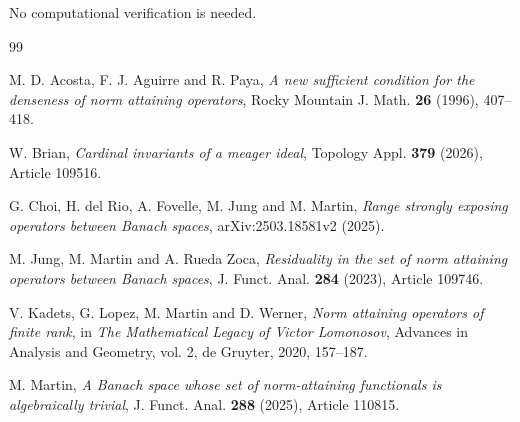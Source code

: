 \documentclass[11pt]{article}
\begin{document}
No computational verification is needed.

\begin{thebibliography}{99}

M. D. Acosta, F. J. Aguirre and R. Paya,
\emph{A new sufficient condition for the denseness of norm attaining operators},
Rocky Mountain J. Math. \textbf{26} (1996), 407--418.

W. Brian,
\emph{Cardinal invariants of a meager ideal},
Topology Appl. \textbf{379} (2026), Article 109516.

G. Choi, H. del Rio, A. Fovelle, M. Jung and M. Martin,
\emph{Range strongly exposing operators between Banach spaces},
arXiv:2503.18581v2 (2025).

M. Jung, M. Martin and A. Rueda Zoca,
\emph{Residuality in the set of norm attaining operators between Banach spaces},
J. Funct. Anal. \textbf{284} (2023), Article 109746.

V. Kadets, G. Lopez, M. Martin and D. Werner,
\emph{Norm attaining operators of finite rank},
in \emph{The Mathematical Legacy of Victor Lomonosov},
Advances in Analysis and Geometry, vol. 2, de Gruyter, 2020, 157--187.

M. Martin,
\emph{A Banach space whose set of norm-attaining functionals is algebraically trivial},
J. Funct. Anal. \textbf{288} (2025), Article 110815.

\end{thebibliography}
\end{document}
